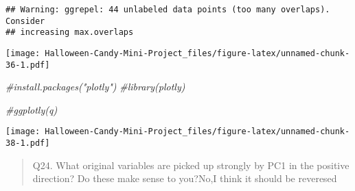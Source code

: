 \documentclass[
]{article}
\newenvironment{Shaded}{\begin{snugshade}}{\end{snugshade}}
\newcommand{\AttributeTok}[1]{\textcolor[rgb]{0.13,0.29,0.53}{#1}}
\newcommand{\CommentTok}[1]{\textcolor[rgb]{0.56,0.35,0.01}{\textit{#1}}}
\newcommand{\DecValTok}[1]{\textcolor[rgb]{0.00,0.00,0.81}{#1}}
\newcommand{\FunctionTok}[1]{\textcolor[rgb]{0.13,0.29,0.53}{\textbf{#1}}}
\newcommand{\NormalTok}[1]{#1}
\newcommand{\SpecialCharTok}[1]{\textcolor[rgb]{0.81,0.36,0.00}{\textbf{#1}}}
\newcommand{\StringTok}[1]{\textcolor[rgb]{0.31,0.60,0.02}{#1}}
\begin{document}
\begin{verbatim}
## Warning: ggrepel: 44 unlabeled data points (too many overlaps). Consider
## increasing max.overlaps
\end{verbatim}

\texttt{[image: Halloween-Candy-Mini-Project\_files/figure-latex/unnamed-chunk-36-1.pdf]}

\begin{Shaded}
\begin{Highlighting}[]
\CommentTok{\#install.packages("plotly")}
\CommentTok{\#library(plotly)}

\CommentTok{\#ggplotly(q)}
\end{Highlighting}
\end{Shaded}

\begin{Shaded}
\end{Shaded}

\texttt{[image: Halloween-Candy-Mini-Project\_files/figure-latex/unnamed-chunk-38-1.pdf]}

\begin{quote}
Q24. What original variables are picked up strongly by PC1 in the
positive direction? Do these make sense to you?No,I think it should be
reveresed
\end{quote}
\end{document}
